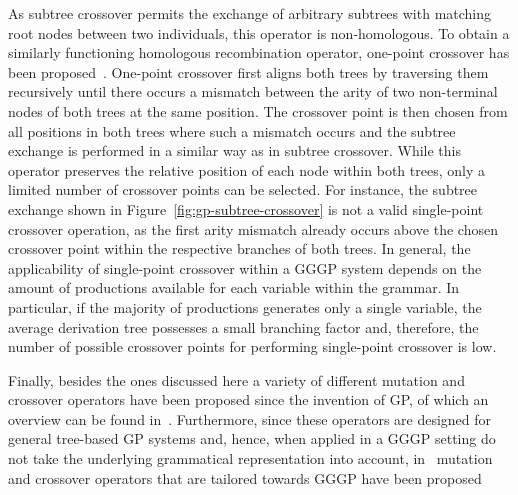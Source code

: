 As subtree crossover permits the exchange of arbitrary subtrees with matching root nodes between two individuals, this operator is non-homologous.
To obtain a similarly functioning homologous recombination operator, one-point crossover has been proposed~\cite{poli1998schema}.
One-point crossover first aligns both trees by traversing them recursively until there occurs a mismatch between the arity of two non-terminal nodes of both trees at the same position.
The crossover point is then chosen from all positions in both trees where such a mismatch occurs and the subtree exchange is performed in a similar way as in subtree crossover.
While this operator preserves the relative position of each node within both trees, only a limited number of crossover points can be selected.
For instance, the subtree exchange shown in Figure~\ref{fig:gp-subtree-crossover} is not a valid single-point crossover operation, as the first arity mismatch already occurs above the chosen crossover point within the respective branches of both trees.
In general, the applicability of single-point crossover within a GGGP system depends on the amount of productions available for each variable within the grammar.
In particular, if the majority of productions generates only a single variable, the average derivation tree possesses a small branching factor and, therefore, the number of possible crossover points for performing single-point crossover is low.

Finally, besides the ones discussed here a variety of different mutation and crossover operators have been proposed since the invention of GP, of which an overview can be found in~\cite{poli2008field}.
Furthermore, since these operators are designed for general tree-based GP systems and, hence, when applied in a GGGP setting do not take the underlying grammatical representation into account, in~\cite{couchet2007crossover} mutation and crossover operators that are tailored towards GGGP have been proposed    
